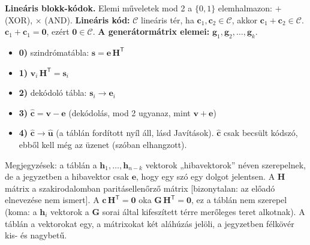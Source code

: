 \textbf{Lineáris blokk-kódok.} Elemi műveletek mod 2 a $\{0,1\}$ elemhalmazon: $+$ (XOR), $\times$ (AND). \textbf{Lineáris kód:} $\mathcal C$ lineáris tér, ha $\mathbf c_1,\mathbf c_2\in\mathcal C$, akkor $\mathbf c_1+\mathbf c_2\in\mathcal C$. $\mathbf c_1+\mathbf c_1=\mathbf 0$, ezért $\mathbf 0\in\mathcal C$. \textbf{A generátormátrix elemei:} $\mathbf g_1,\mathbf g_2,\dots,\mathbf g_k$.

\par{}\par

\begin{itemize}
\item \textbf{0)} szindrómatábla: $\mathbf s=\mathbf e\,\mathbf H^{\mathsf T}$
\item \textbf{1)} $\mathbf v_i\,\mathbf H^{\mathsf T}=\mathbf s_i$
\item \textbf{2)} dekódoló tábla: $\mathbf s_i\to\mathbf e_i$
\item \textbf{3)} $\hat{\mathbf c}=\mathbf v-\mathbf e$ (dekódolás, mod 2 ugyanaz, mint $\mathbf v+\mathbf e$)
\item \textbf{4)} $\hat{\mathbf c}\to\hat{\mathbf u}$ (a táblán fordított nyíl áll, lásd Javítások). $\hat{\mathbf c}$ csak becsült kódszó, ebből kell még az üzenet (szóban elhangzott).
\end{itemize}

Megjegyzések: a táblán a $\mathbf h_1,\dots,\mathbf h_{n-k}$ vektorok „hibavektorok” néven szerepelnek, de a jegyzetben a hibavektor csak $\mathbf e$, hogy egy szó egy dolgot jelentsen. A $\mathbf H$ mátrix a szakirodalomban paritásellenőrző mátrix [bizonytalan: az előadó elnevezése nem ismert]. A $\mathbf c\,\mathbf H^{\mathsf T}=\mathbf 0$ oka $\mathbf G\,\mathbf H^{\mathsf T}=\mathbf 0$, ez a táblán nem szerepel (koma: a $\mathbf h_i$ vektorok a $\mathbf G$ sorai által kifeszített térre merőleges teret alkotnak). A táblán a vektorokat egy, a mátrixokat két aláhúzás jelöli, a jegyzetben félkövér kis- és nagybetű.

